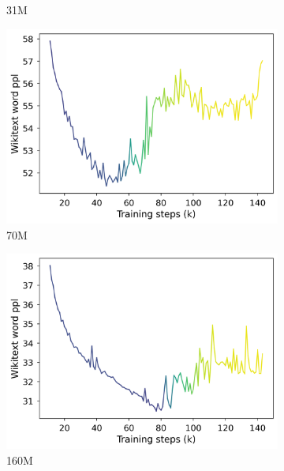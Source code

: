 \begin{figure}[h]
\begin{subfigure}{0.32\columnwidth}
         \caption{31M}
         \label{fig:31M}
    \end{subfigure}
    \begin{subfigure}{0.32\columnwidth}
         \includegraphics[width=\linewidth]{sources/part_1/softmax_bottleneck/imgs/anisotropy_explosion_70m.png}
         \caption{70M}
         \label{fig:70M}
    \end{subfigure}
    \begin{subfigure}{0.32\columnwidth}
         \includegraphics[width=\linewidth]{sources/part_1/softmax_bottleneck/imgs/anisotropy_explosion_160m.png}
         \caption{160M}
         \label{fig:160M}
    \end{subfigure}
    \begin{subfigure}{0.33\columnwidth}

\end{subfigure}
\end{figure}
